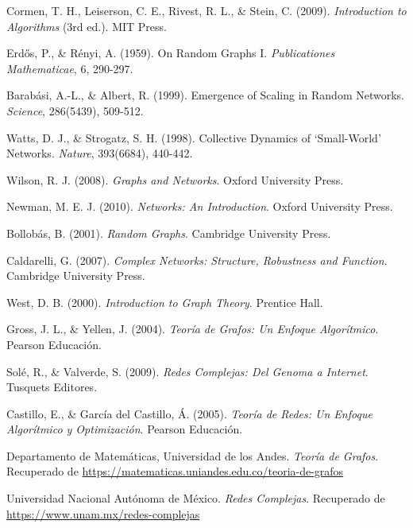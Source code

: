 \begin{thebibliography}{9}
Cormen, T. H., Leiserson, C. E., Rivest, R. L., \& Stein, C. (2009). \textit{Introduction to Algorithms} (3rd ed.). MIT Press.

    
Erdős, P., \& Rényi, A. (1959). On Random Graphs I. \textit{Publicationes Mathematicae}, 6, 290-297.

Barabási, A.-L., \& Albert, R. (1999). Emergence of Scaling in Random Networks. \textit{Science}, 286(5439), 509-512.

Watts, D. J., \& Strogatz, S. H. (1998). Collective Dynamics of ‘Small-World’ Networks. \textit{Nature}, 393(6684), 440-442.

    Wilson, R. J. (2008). \textit{Graphs and Networks}. Oxford University Press.
    
    Newman, M. E. J. (2010). \textit{Networks: An Introduction}. Oxford University Press.
    
    Bollobás, B. (2001). \textit{Random Graphs}. Cambridge University Press.
    
    Caldarelli, G. (2007). \textit{Complex Networks: Structure, Robustness and Function}. Cambridge University Press.
    
    West, D. B. (2000). \textit{Introduction to Graph Theory}. Prentice Hall.

Gross, J. L., \& Yellen, J. (2004). \textit{Teoría de Grafos: Un Enfoque Algorítmico}. Pearson Educación.

Solé, R., \& Valverde, S. (2009). \textit{Redes Complejas: Del Genoma a Internet}. Tusquets Editores.

Castillo, E., \& García del Castillo, Á. (2005). \textit{Teoría de Redes: Un Enfoque Algorítmico y Optimización}. Pearson Educación.

Departamento de Matemáticas, Universidad de los Andes. \textit{Teoría de Grafos}. Recuperado de \url{https://matematicas.uniandes.edu.co/teoria-de-grafos}

Universidad Nacional Autónoma de México. \textit{Redes Complejas}. Recuperado de \url{https://www.unam.mx/redes-complejas}

    
    \end{thebibliography}